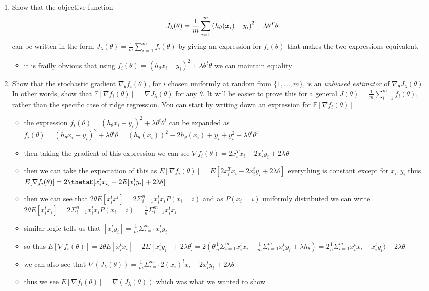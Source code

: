\documentclass{article}
\begin{document}
\begin{enumerate}
\setcounter{enumi}{\value{saveenum}}
\item Show that the objective function 
\[
J_{\lambda}(\theta)=\frac{1}{m}\sum_{i=1}^{m}\left(h_{\theta}(\boldsymbol{x}_{i})-y_{i}\right)^{2}+\lambda\theta^{T}\theta
\]
can be written in the form $J_\lambda(\theta)=\frac{1}{m}\sum_{i=1}^{m}f_{i}(\theta)$
by giving an expression for $f_{i}(\theta)$ that makes the two expressions
equivalent.

\begin{itemize}
    \item it is frailly obvious that using $f_i(\theta)=(h_{\theta}x_i-y_i)^2+\lambda\theta^{t}\theta$ we can maintain equality
\end{itemize}

\item Show that the stochastic gradient $\nabla_\theta f_{i}(\theta)$, for $i$
chosen uniformly at random from $\{1,\ldots,m\}$, is an \emph{unbiased estimator} of $\nabla_\theta J_\lambda(\theta)$. In other words, show that $\mathbb{E}\left[\nabla f_{i}(\theta)\right]=\nabla J_\lambda(\theta)$
for any $\theta$. It will be easier to prove
this for a general $J(\theta)=\frac{1}{m}\sum_{i=1}^{m}f_{i}(\theta)$,
rather than the specific case of ridge regression. You can start by
writing down an expression for $\mathbb{E}\left[\nabla f_{i}(\theta)\right]$
\begin{itemize}
    \item the expression $f_i(\theta)=(h_{\theta}x_i-y_i)^2+\lambda\theta^{t}\theta^{t}$ can be expanded as$f_i(\theta)=(h_{\theta}x_i-y_i)^2+\lambda\theta^{t}\theta= (h_{\theta}(x_i))^2-2h_{\theta}(x_i)+ y_i+y_i^2+\lambda\theta^{t}\theta^{t}$
    \item then taking the gradient of this expression we can see $\nabla f_i(\theta)=2 x_i^{T}x_i-2x_i^{t}y_i+2\lambda \theta$
    \item then we can take the expectation of this as  $E[\nabla f_i(\theta)]=E[2 x_i^{T}x_i-2x_i^{t}y_i+2\lambda \theta]$ everything is constant except for $x_i,y_i$ thus $E[\nabla f_i(\theta)]=2\thetaE[ x_i^{t}x_i]-2E[x_i^{t} y_i]+2\lambda \theta] $
    \item then we can see that $2\theta E[ x_i^{t}x^{i}]=2\Sigma_{i=1}^{n}x_i^{t}x_iP(x_i=i)$ and as $P(x_i=i)$ uniformly distributed we can write$2\theta E[ x_i^{t}x_i]=2\Sigma_{i=1}^{n}x_i^{t}x_iP(x_i=i)=\frac{1}{n}\Sigma_{i=1}^{m}x_i^{t}x_i$
    \item similar logic tells us that $[x_i^{t}y_i]=\frac{1}{m}\Sigma_{i=1}^{m}x_i^{t}y_i$
    \item so thus  $E[\nabla f_i(\theta)]=2\theta E[ x_i^{t}x_i]-2E[x_i^{t} y_i]+2\lambda \theta]=2(\theta \frac{1}{n}\Sigma_{i=1}^{m}x_i^{t}x_i-\frac{1}{m}\Sigma_{i=1}^{m}x_i^{t}y_i+\lambda h_{\theta})=2\frac{1}{n}\Sigma_{i=1}^{m} x_i^{t}x_i-x_i^{t}y_i)+2\lambda \theta$
    \item we can also see that $\nabla(J_{\lambda}(\theta))=\frac{1}{m}\Sigma_{i=1}^{m}2(x_i)^{t}x_i-2x_i^{t}y_i+2\lambda \theta$
    \item thus we see $E[\nabla f_i(\theta)]=\nabla(J_{\lambda}(\theta))$ which was what we wanted to show
\end{itemize}


\end{enumerate}
\end{document}
